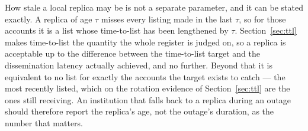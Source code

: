 \documentclass[10pt,a4paper,twocolumn]{article}
\begin{document}
How stale a local replica may be is not a separate parameter, and it can be
stated exactly. A replica of age $\tau$ misses every listing made in the last
$\tau$, so for those accounts it is a list whose time-to-list has been
lengthened by $\tau$. Section~\ref{sec:ttl} makes time-to-list the quantity the
whole register is judged on, so a replica is acceptable up to the difference
between the time-to-list target and the dissemination latency actually
achieved, and no further. Beyond that it is equivalent to no list for exactly
the accounts the target exists to catch --- the most recently listed, which on
the rotation evidence of Section~\ref{sec:ttl} are the ones still receiving. An
institution that falls back to a replica during an outage should therefore
report the replica's age, not the outage's duration, as the number that
matters.
\end{document}

